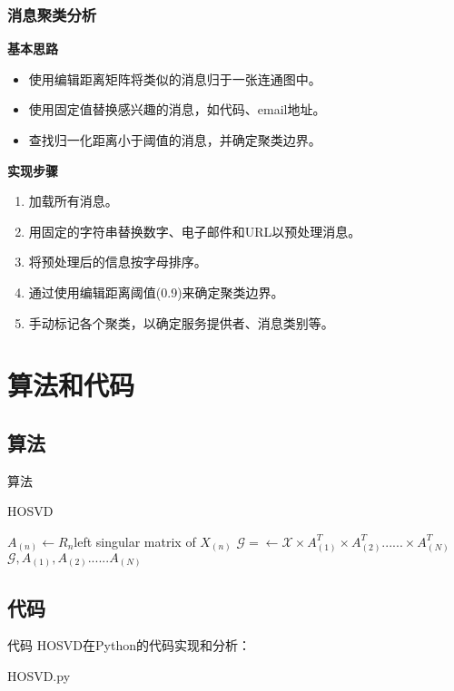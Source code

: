 \documentclass[10pt,aspectratio=43,table,fontset=none]{beamer}
\begin{document}
\begin{frame}
\frametitle{消息聚类分析}
\begin{block}{\textbf{基本思路}}
	\begin{itemize}
		\item<0-> 使用编辑距离矩阵将类似的消息归于一张连通图中。
		\item<0-> 使用固定值替换感兴趣的消息，如代码、email地址。
		\item<0-> 查找归一化距离小于阈值的消息，并确定聚类边界。
	\end{itemize}
\end{block}

\begin{block}{\textbf{实现步骤}}
	\begin{enumerate}
		\item<0-> 加载所有消息。
		\item<0-> 用固定的字符串替换数字、电子邮件和URL以预处理消息。
		\item<0-> 将预处理后的信息按字母排序。
		\item<0-> 通过使用编辑距离阈值(0.9)来确定聚类边界。
		\item<0-> 手动标记各个聚类，以确定服务提供者、消息类别等。
	\end{enumerate}
\end{block}
\end{frame}

\section{算法和代码}
\subsection{算法}
\begin{frame}{算法}
\begin{algorithm}[H]
	\caption{HOSVD}
	\small 
	
	{
		$A_{(n)}\leftarrow R_{n}$left singular matrix of $X_{(n)}$
	}
	$\mathcal{G}=\leftarrow \mathcal{X} \times A_{(1)}^{T} \times A_{(2)}^{T}...... \times A_{(N)}^{T}$\\
	\Return $\mathcal{G},A_{(1)},A_{(2)}......A_{(N)} $
\end{algorithm}
\end{frame}

\subsection{代码}
\begin{frame}[fragile]{代码}
HOSVD在Python的代码实现和分析：

{HOSVD.py}
\end{frame}
\end{document}
